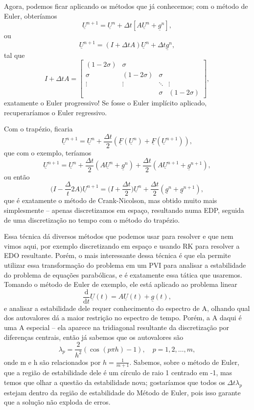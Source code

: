 \documentclass[../differential_methods.tex]{subfiles}
\begin{document}
Agora, podemos ficar aplicando os métodos que já conhecemos; com o método de Euler, obteríamos
\[
	\underline{U}^{n+1} = \underline{U}^{n} + \Delta t[A\underline{U}^{n} + \underline{g}^{n}],
\]
ou
\[
	\underline{U}^{n+1} = ( I + \Delta t A) \underline{U}^{n} + \Delta t \underline{g}^{n},
\]
tal que
\[
	I+\Delta t A = \begin{bmatrix}
		(1-2\sigma ) & \sigma       &        &              \\
		\sigma       & (1-2\sigma ) & \sigma &              \\
		\vdots       & \vdots       & \ddots & \vdots       \\
		             &              & \sigma & (1-2\sigma )
	\end{bmatrix},
\]
exatamente o Euler progressivo! Se fosse o Euler implícito aplicado, recuperaríamos o Euler regressivo.

Com o trapézio, ficaria
\[
	\underline{U}^{n+1} = \underline{U}^{n} + \frac{\Delta t}{2}(\underline{F}(\underline{U}^{n}) + \underline{F}(\underline{U}^{n+1})),
\]
que com o exemplo, teríamos
\[
	\underline{U}^{n+1} = \underline{U}^{n} + \frac{\Delta t}{2}(A\underline{U}^{n} + \underline{g}^{n}) + \frac{\Delta t}{2}(A \underline{U}^{n+1} + \underline{g}^{n+1}),
\]
ou então
\[
	\biggl(I-\frac{\Delta }{t}2A\biggr) \underline{U}^{n+1} = \biggl(I+\frac{\Delta t}{2}\biggr)\underline{U}^{n} + \frac{\Delta t}{2}(\underline{g}^{n} + \underline{g}^{n+1}),
\]
que é exatamente o método de Crank-Nicolson, mas obtido muito mais simplesmente -- apenas discretizamos em espaço, resultando numa EDP, seguida de uma discretização no tempo com o método do trapézio.

Essa técnica dá diversos métodos que podemos usar para resolver e que nem vimos aqui, por exemplo discretizando em espaço e usando RK para resolver a EDO resultante. Porém, o mais interessante dessa técnica é que ela permite utilizar essa transformação do problema em um PVI para analisar a estabilidade do problema de equações parabólicas, e é exatamente essa tática que usaremos.
Tomando o método de Euler de exemplo, ele está aplicado ao problema linear
\[
	\frac{\mathrm{d}}{\mathrm{d}t} \underline{U}(t) = A \underline{U}(t) + \underline{g}(t),
\]
e analisar a estabilidade dele requer conhecimento do espectro de A, olhando qual dos autovalores dá a maior restrição no espectro de tempo. Porém, a A daqui é uma A especial -- ela aparece na tridiagonal resultante da discretização por diferenças centrais, então já sabemos que os autovalores são
\[
	\lambda_p = \frac{2}{h^{2}}(\cos^{}{(p\pi h)}-1), \quad p=1,2,\dotsc ,m,
\]
onde m e h são relacionados por \(\displaystyle h = \frac{1}{m+1}\). Sabemos, sobre o método de Euler, que a região de estabilidade dele é um círculo de raio 1 centrado em -1, mas temos que olhar a questão da estabilidade nova; gostaríamos que todos os \(\Delta t \lambda_p\) estejam dentro da região de estabilidade do Método de Euler, pois isso garante que a solução não exploda de erros.
\end{document}
